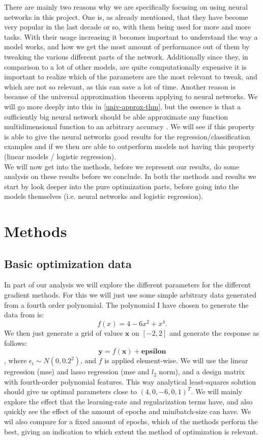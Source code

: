 \documentclass{article}
\begin{document}
There are mainly two reasons why we are specifically focusing on using neural
networks in this project. One is, as already mentioned, that they have become
very popular in the last decade or so, with them being used for more and more
tasks. With their usage increasing it becomes important to understand the way a
model works, and how we get the most amount of performance out of them by
tweaking the various different parts of the network. Additionally since they, in
comparison to a lot of other models, are quite computationally expensive it is
important to realize which of the parameters are the most relevant to tweak, and
which are not so relevant, as this can save a lot of time. Another reason is
because of the universal approximation theorem applying to neural networks. We
will go more deeply into this in \ref{univ-approx-thm}, but the essence is that
a sufficiently big neural network should be able approximate any function
multidimensional function to an arbitrary accuracy
\cite[s.~13.5]{lecutenotes13}. We will see if this property is able to give the
neural networks good results for the regression/classification examples and if
we then are able to outperform models not having this property (linear models /
logistic regression).
\\

We will now get into the methods, before we represent our results, do some
analysis on these results before we conclude. In both the methods and results we
start by look deeper into the pure optimization parts, before going into the
models themselves (i.e. neural networks and logistic regression).

\section{Methods}
\subsection{Basic optimization data}
\label{basicoptdesc}
In part of our analysis we will explore the different parameters for the
different gradient methods. For this we will just use some simple arbitrary data
generated from a fourth order polynomial. The polynomial I have chosen to
generate the data from is:
$$f(x) = 4 - 6 x^2 + x^4.$$
We then just generate a grid of values $\bm{x}$ on $[-2, 2]$ and generate the
response as follows:
$$\bm{y} = f(\bm{x}) + \bm{epsilon}$$
, where $\epsilon_i \sim N(0, 0.2^2)$, and $f$ is applied element-wise.  We will
use the linear regression (mse) and lasso regression (mse and $l_2$ norm), and a
design matrix with fourth-order polynomial features. This way analytical
least-squares solution should give us optimal parameters close to $(4, 0, -6, 0,
      1)^T$. We will mainly explore the effect that the learning-rate and
regularization terms have, and also quickly see the effect of the amount
of epochs and minibatch-size can have. We wil also compare for a fixed
amount of epochs, which of the methods perform the best, giving an
indication to which extent the method of optimization is relevant.
\end{document}
